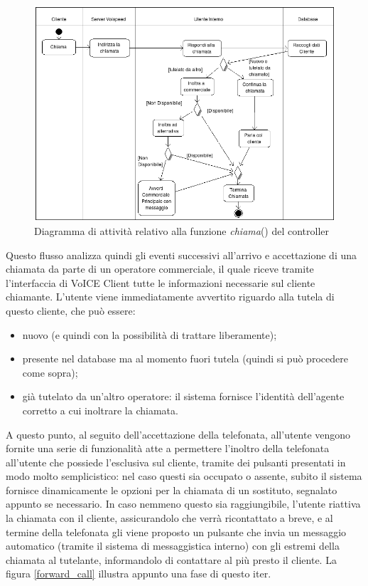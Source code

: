 \begin{figure}[!ht]
\centering
  \includegraphics[scale=0.7]{./images/chiamataAct.png}
\caption{Diagramma di attivit\`a relativo alla funzione \textit{chiama}() del controller}
\label{act_call}
\end{figure}

\noindent
Questo flusso analizza quindi gli eventi successivi all'arrivo e accettazione di una chiamata da parte di un operatore commerciale, il quale riceve tramite l'interfaccia di VoICE Client tutte le informazioni necessarie sul cliente chiamante. L'utente viene immediatamente avvertito riguardo alla tutela di questo cliente, che pu\`o essere:
\begin{itemize}
 \item nuovo (e quindi con la possibilit\`a di trattare liberamente);
 \item presente nel database ma al momento fuori tutela (quindi si pu\`o procedere come sopra);
 \item gi\`a tutelato da un'altro operatore: il sistema fornisce l'identit\`a dell'agente corretto a cui inoltrare la chiamata.
\end{itemize}
\noindent
A questo punto, al seguito dell'accettazione della telefonata, all'utente vengono fornite una serie di funzionalit\`a atte a permettere l'inoltro della telefonata all'utente che possiede l'esclusiva sul cliente, tramite dei pulsanti presentati in modo molto semplicistico: nel caso questi sia occupato o assente, subito il sistema fornisce dinamicamente le opzioni per la chiamata di un sostituto, segnalato appunto se necessario. In caso nemmeno questo sia raggiungibile, l'utente riattiva la chiamata con il cliente, assicurandolo che verr\`a ricontattato a breve, e al termine della telefonata gli viene proposto un pulsante che invia un messaggio automatico (tramite il sistema di messaggistica interno) con gli estremi della chiamata al tutelante, informandolo di contattare al pi\`u presto il cliente. La figura \ref{forward_call} illustra appunto una fase di questo iter. 

